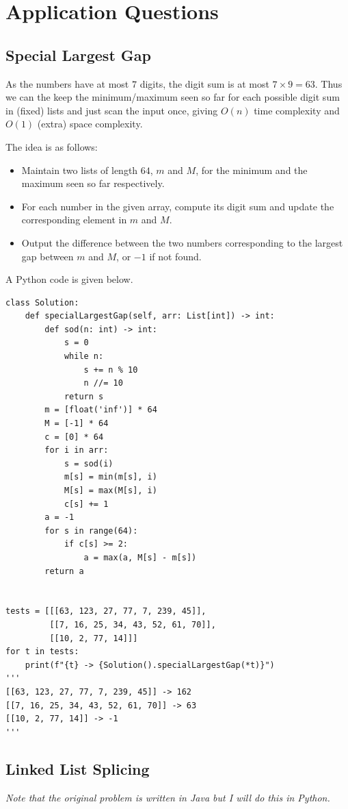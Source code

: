 \documentclass[12pt]{article}
\begin{document}
\section{Application Questions}
\subsection{Special Largest Gap}
As the numbers have at most $7$ digits, the digit sum is at most $7\times9=63$. Thus we can the keep the minimum/maximum seen so far for each possible digit sum in (fixed) lists and just scan the input once, giving $O(n)$ time complexity and $O(1)$ (extra) space complexity.

The idea is as follows:
\begin{itemize}
\item Maintain two lists of length $64$, $m$ and $M$, for the minimum and the maximum seen so far respectively.
\item For each number in the given array, compute its digit sum and update the corresponding element in $m$ and $M$.
\item Output the difference between the two numbers corresponding to the largest gap between $m$ and $M$, or $-1$ if not found.
\end{itemize}

A Python code is given below.
\begin{verbatim}
class Solution:
    def specialLargestGap(self, arr: List[int]) -> int:
        def sod(n: int) -> int:
            s = 0
            while n:
                s += n % 10
                n //= 10
            return s
        m = [float('inf')] * 64
        M = [-1] * 64
        c = [0] * 64
        for i in arr:
            s = sod(i)
            m[s] = min(m[s], i)
            M[s] = max(M[s], i)
            c[s] += 1
        a = -1
        for s in range(64):
            if c[s] >= 2:
                a = max(a, M[s] - m[s])
        return a


tests = [[[63, 123, 27, 77, 7, 239, 45]],
         [[7, 16, 25, 34, 43, 52, 61, 70]],
         [[10, 2, 77, 14]]]
for t in tests:
    print(f"{t} -> {Solution().specialLargestGap(*t)}")
'''
[[63, 123, 27, 77, 7, 239, 45]] -> 162
[[7, 16, 25, 34, 43, 52, 61, 70]] -> 63
[[10, 2, 77, 14]] -> -1
'''
\end{verbatim}
\subsection{Linked List Splicing}
\textit{Note that the original problem is written in Java but I will do this in Python.}
\end{document}
